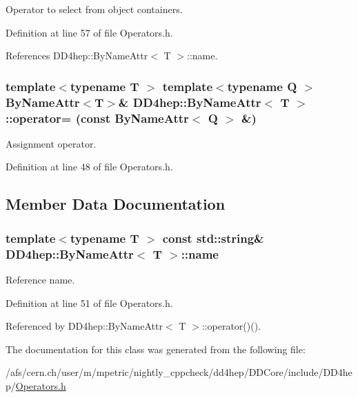 Operator to select from object containers. 

Definition at line 57 of file Operators.h.

References DD4hep::ByNameAttr$<$ T $>$::name.\hypertarget{class_d_d4hep_1_1_by_name_attr_ae3d9f2b875913f9b5cf884c4b4cf4863}{
\subsubsection[{operator=}]{\setlength{\rightskip}{0pt plus 5cm}template$<$typename T $>$ template$<$typename Q $>$ {\bf ByNameAttr}$<${\bf T}$>$\& {\bf DD4hep::ByNameAttr}$<$ {\bf T} $>$::operator= (const {\bf ByNameAttr}$<$ Q $>$ \&)}}
\label{class_d_d4hep_1_1_by_name_attr_ae3d9f2b875913f9b5cf884c4b4cf4863}


Assignment operator. 

Definition at line 48 of file Operators.h.

\subsection{Member Data Documentation}
\hypertarget{class_d_d4hep_1_1_by_name_attr_af7353d051e867c65d04fc7efb9975717}{
\subsubsection[{name}]{\setlength{\rightskip}{0pt plus 5cm}template$<$typename T $>$ const std::string\& {\bf DD4hep::ByNameAttr}$<$ {\bf T} $>$::{\bf name}}}
\label{class_d_d4hep_1_1_by_name_attr_af7353d051e867c65d04fc7efb9975717}


Reference name. 

Definition at line 51 of file Operators.h.

Referenced by DD4hep::ByNameAttr$<$ T $>$::operator()().

The documentation for this class was generated from the following file:\begin{DoxyCompactItemize}
\item 
/afs/cern.ch/user/m/mpetric/nightly\_\-cppcheck/dd4hep/DDCore/include/DD4hep/\hyperlink{_operators_8h}{Operators.h}\end{DoxyCompactItemize}

